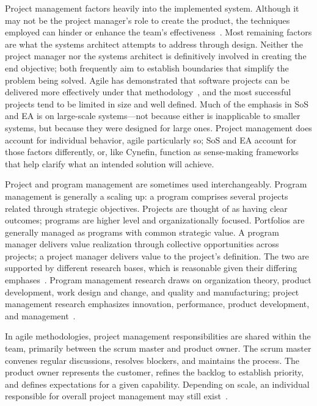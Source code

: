 \documentclass[11pt,a4paper]{article}
\begin{document}
Project management factors heavily into the implemented system. Although it may
not be the project manager's role to create the product, the techniques employed
can hinder or enhance the team's effectiveness~\citep{munns1996}. Most remaining
factors are what the systems architect attempts to address through design.
Neither the project manager nor the systems architect is definitively involved
in creating the end objective; both frequently aim to establish boundaries that
simplify the problem being solved. Agile has demonstrated that software projects
can be delivered more effectively under that
methodology~\citep{sandle2020,rasnacis2017}, and the most successful projects
tend to be limited in size and well defined. Much of the emphasis in SoS and EA
is on large-scale systems---not because either is inapplicable to smaller
systems, but because they were designed for large ones. Project management does
account for individual behavior, agile particularly so; SoS and EA account for
those factors differently, or, like Cynefin, function as sense-making frameworks
that help clarify what an intended solution will achieve.

Project and program management are sometimes used interchangeably. Program
management is generally a scaling up: a program comprises several projects
related through strategic objectives. Projects are thought of as having clear
outcomes; programs are higher level and organizationally focused. Portfolios are
generally managed as programs with common strategic value. A program manager
delivers value realization through collective opportunities across projects; a
project manager delivers value to the project's definition. The two are
supported by different research bases, which is reasonable given their differing
emphases~\citep{weaver2010}. Program management research draws on organization
theory, product development, work design and change, and quality and
manufacturing; project management research emphasizes innovation, performance,
product development, and management~\citep{artto2009}.

In agile methodologies, project management responsibilities are shared within
the team, primarily between the scrum master and product owner. The scrum master
convenes regular discussions, resolves blockers, and maintains the process. The
product owner represents the customer, refines the backlog to establish
priority, and defines expectations for a given capability. Depending on scale,
an individual responsible for overall project management may still
exist~\citep{sliger2011}.
\end{document}

